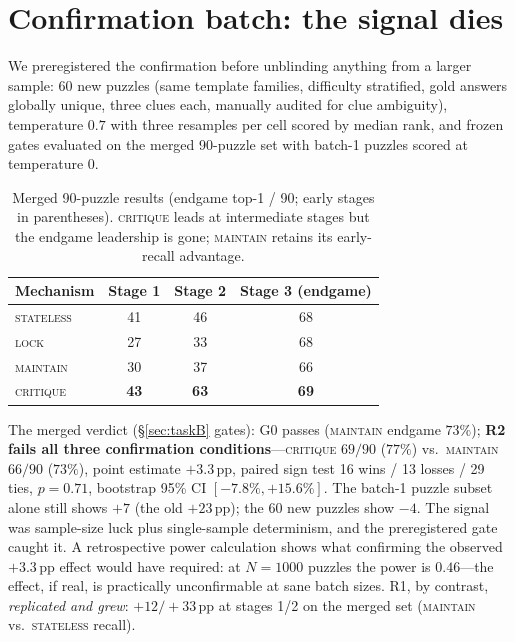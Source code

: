 \documentclass[10pt]{article}
\newcommand{\Mstate}{\textsc{stateless}}
\newcommand{\Mlock}{\textsc{lock}}
\newcommand{\Mmaint}{\textsc{maintain}}
\newcommand{\Mcrit}{\textsc{critique}}
\begin{document}
\section{Confirmation batch: the signal dies}
\label{sec:confirm}

We preregistered the confirmation before unblinding anything from a
larger sample: 60 new puzzles (same template families, difficulty
stratified, gold answers globally unique, three clues each, manually
audited for clue ambiguity), temperature $0.7$ with three resamples per
cell scored by median rank, and frozen gates evaluated on the merged
90-puzzle set with batch-1 puzzles scored at temperature 0.

\begin{table}[h]
\centering
\small
\caption{Merged 90-puzzle results (endgame top-1 / 90; early stages in
parentheses). \Mcrit{} leads at intermediate stages but the endgame
leadership is gone; \Mmaint{} retains its early-recall advantage.}
\label{tab:merged}
\begin{tabular}{lccc}
\toprule
Mechanism & Stage 1 & Stage 2 & Stage 3 (endgame) \\
\midrule
\Mstate{} & 41 & 46 & 68 \\
\Mlock{}  & 27 & 33 & 68 \\
\Mmaint{} & 30 & 37 & 66 \\
\Mcrit{}  & \textbf{43} & \textbf{63} & \textbf{69} \\
\bottomrule
\end{tabular}
\end{table}

The merged verdict (\S\ref{sec:taskB} gates): G0 passes
(\Mmaint{} endgame $73\%$); \textbf{R2 fails all three confirmation
conditions}---\Mcrit{} $69/90$ ($77\%$) vs.\ \Mmaint{} $66/90$ ($73\%$),
point estimate $+3.3$\,pp, paired sign test 16 wins / 13 losses / 29 ties,
$p = 0.71$, bootstrap 95\% CI $[-7.8\%, +15.6\%]$. The batch-1 puzzle
subset alone still shows $+7$ (the old $+23$\,pp); the 60 new puzzles
show $-4$. The signal was sample-size luck plus single-sample
determinism, and the preregistered gate caught it. A retrospective power
calculation shows what confirming the observed $+3.3$\,pp effect would
have required: at $N = 1000$ puzzles the power is $0.46$---the effect, if
real, is practically unconfirmable at sane batch sizes. R1, by contrast,
\emph{replicated and grew}: $+12/+33$\,pp at stages 1/2 on the merged
set (\Mmaint{} vs.\ \Mstate{} recall).
\end{document}
